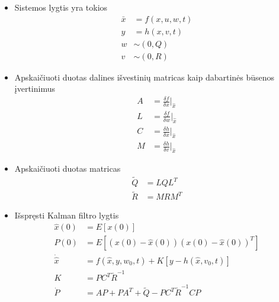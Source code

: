         \begin{itemize}
            \item Sistemos lygtis yra tokios
            \begin{equation}
                \begin{aligned}
                \bar{x} &= f(x, u, w, t) \\
                y &= h(x, v, t) \\
                w &\sim (0,Q) \\
                v &\sim (0, R)
                \end{aligned}
            \end{equation}
            \item Apskaičiuoti duotas dalines išvestinių matricas kaip dabartinės būsenos įvertinimus
            \begin{equation}
                \begin{aligned}
                    A &= \frac{\delta f}{\delta x}\Bigr|_{\hat{x}} \\
                    L &= \frac{\delta f}{\delta w}\Bigr|_{\hat{x}} \\
                    C &= \frac{\delta h}{\delta x}\Bigr|_{\hat{x}} \\
                    M &= \frac{\delta h}{\delta v}\Bigr|_{\hat{x}}
                \end{aligned}
            \end{equation}
            \item Apskaičiuoti duotas matricas
            \begin{equation}
                \label{eq:ekf_q_r}
                \begin{aligned}
                    \tilde{Q} &= LQL^T \\
                    \tilde{R} &= MRM^T
                \end{aligned}
            \end{equation}
            \item Išspręsti Kalman filtro lygtis
            \begin{equation}
                \label{eq:ekf}
                \begin{aligned}
                    \hat{x}(0) &= E[x(0)]  \\
                    P(0) &= E[ (x(0) - \hat{x}(0))(x(0) - \hat{x}(0))^T ] \\
                    \dot{\hat{x}} &= f(\hat{x}, y, w_0, t) + K[y - h(\hat{x}, v_0, t)] \\
                    K &= PC^T\tilde{R}^{-1} \\
                    \dot{P} &= AP + PA^T + \tilde{Q} - PC^T\tilde{R}^{-1}CP
                \end{aligned}
            \end{equation}
        \end{itemize}


